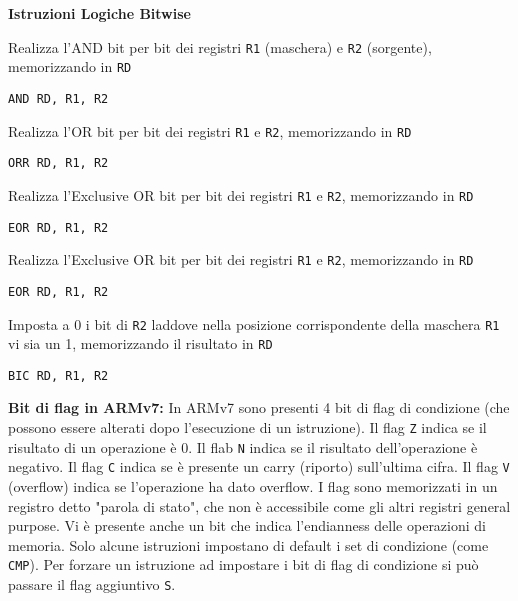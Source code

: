 \begin{defn}
	\textbf{Istruzioni Logiche Bitwise}
	
	Realizza l'AND bit per bit dei registri \verb|R1| (maschera) e \verb|R2| (sorgente), memorizzando in \verb|RD|
	\begin{lstlisting}[style=arm]
	AND RD, R1, R2
	\end{lstlisting}
	
	Realizza l'OR bit per bit dei registri \verb|R1| e \verb|R2|, memorizzando in \verb|RD|
	\begin{lstlisting}[style=arm]
	ORR RD, R1, R2
	\end{lstlisting}
	
	Realizza l'Exclusive OR bit per bit dei registri \verb|R1| e \verb|R2|, memorizzando in \verb|RD|
	\begin{lstlisting}[style=arm]
	EOR RD, R1, R2
	\end{lstlisting}
	
	Realizza l'Exclusive OR bit per bit dei registri \verb|R1| e \verb|R2|, memorizzando in \verb|RD|
	\begin{lstlisting}[style=arm]
	EOR RD, R1, R2
	\end{lstlisting}
	
	Imposta a 0 i bit di \verb|R2| laddove nella posizione corrispondente della maschera \verb|R1| vi sia un 1, memorizzando il risultato in \verb|RD|
	\begin{lstlisting}[style=arm]
	BIC RD, R1, R2
	\end{lstlisting}
\end{defn}

\begin{defn}
	\textbf{Bit di flag in ARMv7:}
	In ARMv7 sono presenti 4 bit di flag di condizione (che possono essere alterati dopo l'esecuzione di un istruzione). Il flag \verb|Z| indica se il risultato di un operazione è 0. Il flab \verb|N| indica se il risultato dell'operazione è negativo. Il flag \verb|C| indica se è presente un carry (riporto) sull'ultima cifra. Il flag \verb|V| (overflow) indica se l'operazione ha dato overflow. I flag sono memorizzati in un registro detto "parola di stato", che non è accessibile come gli altri registri general purpose. Vi è presente anche un bit che indica l'endianness delle operazioni di memoria.
	Solo alcune istruzioni impostano di default i set di condizione (come \verb|CMP|). Per forzare un istruzione ad impostare i bit di flag di condizione si può passare il flag aggiuntivo \verb|S|.
\end{defn}

